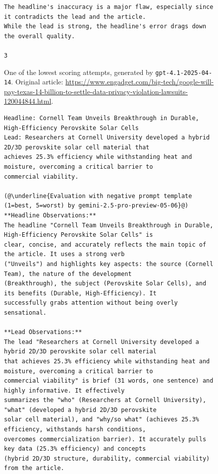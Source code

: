 \documentclass[UTF8,noindent,nohyp,parspace,titlepage,a4paper,12pt]{article}
\begin{document}
\begin{figure}[!hbtp]
\begin{lstlisting}[basicstyle=\fontsize{7pt}{8pt}\selectfont\sffamily,frame=single,linewidth=\textwidth]
The headline's inaccuracy is a major flaw, especially since it contradicts the lead and the article.
While the lead is strong, the headline's error drags down the overall quality.

3
      \end{lstlisting}
      \caption{%
        One of the lowest scoring attempts, generated by
        \texttt{gpt-4.1-2025-04-14}. Original article:
        \url{https://www.engadget.com/big-tech/google-will-pay-texas-14-billion-to-settle-data-privacy-violation-lawsuits-120044844.html}.
      }
    \end{figure}

    \begin{figure}[!hbtp]
      \begin{lstlisting}[basicstyle=\fontsize{7pt}{8pt}\selectfont\sffamily,frame=single,linewidth=\textwidth]
Headline: Cornell Team Unveils Breakthrough in Durable, High-Efficiency Perovskite Solar Cells
Lead: Researchers at Cornell University developed a hybrid 2D/3D perovskite solar cell material that
achieves 25.3% efficiency while withstanding heat and moisture, overcoming a critical barrier to
commercial viability.

(@\underline{Evaluation with negative prompt template (1=best, 5=worst) by gemini-2.5-pro-preview-05-06}@)
**Headline Observations:**
The headline "Cornell Team Unveils Breakthrough in Durable, High-Efficiency Perovskite Solar Cells" is
clear, concise, and accurately reflects the main topic of the article. It uses a strong verb
("Unveils") and highlights key aspects: the source (Cornell Team), the nature of the development
(Breakthrough), the subject (Perovskite Solar Cells), and its benefits (Durable, High-Efficiency). It
successfully grabs attention without being overly sensational.

**Lead Observations:**
The lead "Researchers at Cornell University developed a hybrid 2D/3D perovskite solar cell material
that achieves 25.3% efficiency while withstanding heat and moisture, overcoming a critical barrier to
commercial viability" is brief (31 words, one sentence) and highly informative. It effectively
summarizes the "who" (Researchers at Cornell University), "what" (developed a hybrid 2D/3D perovskite
solar cell material), and "why/so what" (achieves 25.3% efficiency, withstands harsh conditions,
overcomes commercialization barrier). It accurately pulls key data (25.3% efficiency) and concepts
(hybrid 2D/3D structure, durability, commercial viability) from the article.


\end{lstlisting}
\end{figure}
\end{document}
